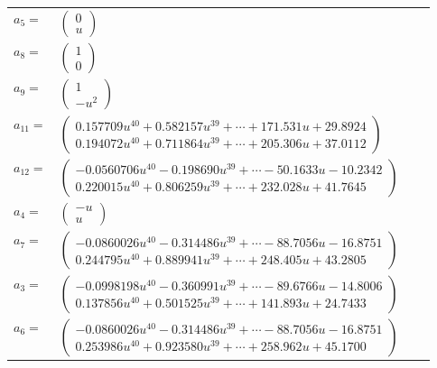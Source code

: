 \documentclass[1p]{elsarticle_modified}
\theoremstyle{definition}
\begin{document}
\begin{tabular}{m{7pt} m{180pt} m{7pt} m{180pt} }
\flushright $a_{5}=$&$\begin{pmatrix}0\\u\end{pmatrix}$ \\
\flushright $a_{8}=$&$\begin{pmatrix}1\\0\end{pmatrix}$ \\
\flushright $a_{9}=$&$\begin{pmatrix}1\\- u^2\end{pmatrix}$ \\
\flushright $a_{11}=$&$\begin{pmatrix}0.157709 u^{40}+0.582157 u^{39}+\cdots+171.531 u+29.8924\\0.194072 u^{40}+0.711864 u^{39}+\cdots+205.306 u+37.0112\end{pmatrix}$ \\
\flushright $a_{12}=$&$\begin{pmatrix}-0.0560706 u^{40}-0.198690 u^{39}+\cdots-50.1633 u-10.2342\\0.220015 u^{40}+0.806259 u^{39}+\cdots+232.028 u+41.7645\end{pmatrix}$ \\
\flushright $a_{4}=$&$\begin{pmatrix}- u\\u\end{pmatrix}$ \\
\flushright $a_{7}=$&$\begin{pmatrix}-0.0860026 u^{40}-0.314486 u^{39}+\cdots-88.7056 u-16.8751\\0.244795 u^{40}+0.889941 u^{39}+\cdots+248.405 u+43.2805\end{pmatrix}$ \\
\flushright $a_{3}=$&$\begin{pmatrix}-0.0998198 u^{40}-0.360991 u^{39}+\cdots-89.6766 u-14.8006\\0.137856 u^{40}+0.501525 u^{39}+\cdots+141.893 u+24.7433\end{pmatrix}$ \\
\flushright $a_{6}=$&$\begin{pmatrix}-0.0860026 u^{40}-0.314486 u^{39}+\cdots-88.7056 u-16.8751\\0.253986 u^{40}+0.923580 u^{39}+\cdots+258.962 u+45.1700\end{pmatrix}$ \\

\end{tabular}
\end{document}
